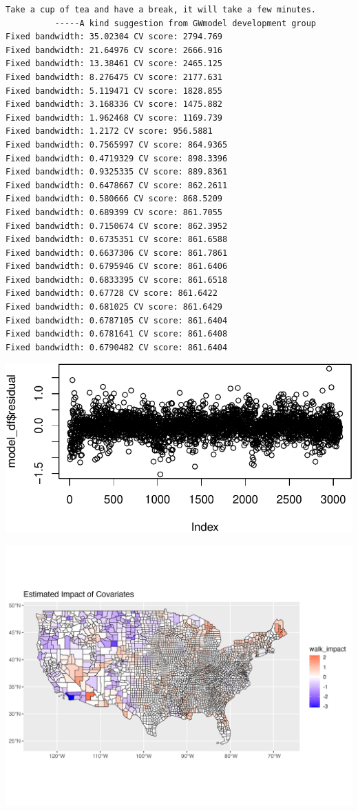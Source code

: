 \documentclass[
]{article}
\begin{document}
\begin{verbatim}
Take a cup of tea and have a break, it will take a few minutes.
          -----A kind suggestion from GWmodel development group
Fixed bandwidth: 35.02304 CV score: 2794.769 
Fixed bandwidth: 21.64976 CV score: 2666.916 
Fixed bandwidth: 13.38461 CV score: 2465.125 
Fixed bandwidth: 8.276475 CV score: 2177.631 
Fixed bandwidth: 5.119471 CV score: 1828.855 
Fixed bandwidth: 3.168336 CV score: 1475.882 
Fixed bandwidth: 1.962468 CV score: 1169.739 
Fixed bandwidth: 1.2172 CV score: 956.5881 
Fixed bandwidth: 0.7565997 CV score: 864.9365 
Fixed bandwidth: 0.4719329 CV score: 898.3396 
Fixed bandwidth: 0.9325335 CV score: 889.8361 
Fixed bandwidth: 0.6478667 CV score: 862.2611 
Fixed bandwidth: 0.580666 CV score: 868.5209 
Fixed bandwidth: 0.689399 CV score: 861.7055 
Fixed bandwidth: 0.7150674 CV score: 862.3952 
Fixed bandwidth: 0.6735351 CV score: 861.6588 
Fixed bandwidth: 0.6637306 CV score: 861.7861 
Fixed bandwidth: 0.6795946 CV score: 861.6406 
Fixed bandwidth: 0.6833395 CV score: 861.6518 
Fixed bandwidth: 0.67728 CV score: 861.6422 
Fixed bandwidth: 0.681025 CV score: 861.6429 
Fixed bandwidth: 0.6787105 CV score: 861.6404 
Fixed bandwidth: 0.6781641 CV score: 861.6408 
Fixed bandwidth: 0.6790482 CV score: 861.6404 
\end{verbatim}

\includegraphics{report_files/figure-pdf/unnamed-chunk-10-1.pdf}

\begin{center}
\includegraphics{impact_plot.png}
\end{center}
\end{document}
